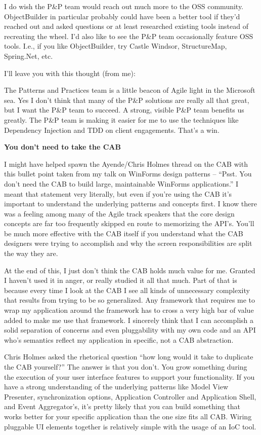 \documentclass{article}
\begin{document}
{I do wish the P\&P team would reach out much more to the OSS community.  ObjectBuilder in particular probably could have been a better tool if they'd reached out and asked questions or at least researched existing tools instead of recreating the wheel.  I'd also like to see the P\&P team occasionally feature OSS tools.  I.e., if you like ObjectBuilder, try Castle Windsor, StructureMap, Spring.Net, etc.

I'll leave you with this thought (from me):

    The Patterns and Practices team is a little beacon of Agile light in the Microsoft sea.  Yes I don't think that many of the P\&P solutions are really all that great, but I want the P\&P team to succeed.  A strong, visible P\&P team benefits us greatly.  The P\&P team is making it easier for me to use the techniques like Dependency Injection and TDD on client engagements.  That's a win.

     

\Large {\textbf {You don't need to take the CAB}}

I might have helped spawn the Ayende/Chris Holmes thread on the CAB with this bullet point taken from my talk on WinForms design patterns – “Psst. You don't need the CAB to build large, maintainable WinForms applications.”  I meant that statement very literally, but even if you're using the CAB it's important to understand the underlying patterns and concepts first.  I know there was a feeling among many of the Agile track speakers that the core design concepts are far too frequently skipped en route to memorizing the API's.  You'll be much more effective with the CAB itself if you understand what the CAB designers were trying to accomplish and why the screen responsibilities are split the way they are.

At the end of this, I just don't think the CAB holds much value for me.  Granted I haven't used it in anger, or really studied it all that much.  Part of that is because every time I look at the CAB I see all kinds of unnecessary complexity that results from trying to be so generalized.  Any framework that requires me to wrap my application around the framework has to cross a very high bar of value added to make me use that framework.  I sincerely think that I can accomplish a solid separation of concerns and even pluggability with my own code and an API who's semantics reflect my application in specific, not a CAB abstraction. 

Chris Holmes asked the rhetorical question “how long would it take to duplicate the CAB yourself?”  The answer is that you don't.  You grow something during the execution of your user interface features to support your functionality.  If you have a strong understanding of the underlying patterns like Model View Presenter, synchronization options, Application Controller and Application Shell, and Event Aggregator's, it's pretty likely that you can build something that works better for your specific application than the one size fits all CAB.  Wiring pluggable UI elements together is relatively simple with the usage of an IoC tool.

}
\end{document}
